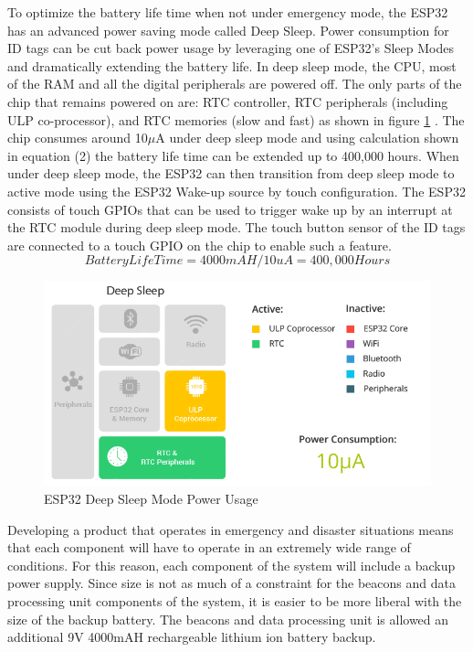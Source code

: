 \pagebreak
To optimize the battery life time when not under emergency mode, the ESP32 has an advanced power saving mode called Deep Sleep. Power consumption for ID tags can be cut back power usage by leveraging one of ESP32’s Sleep Modes and dramatically extending the battery life. In deep sleep mode, the CPU, most of the RAM and all the digital peripherals are powered off. The only parts of the chip that remains powered on are: RTC controller, RTC peripherals (including ULP co-processor), and RTC memories (slow and fast) as shown in figure \ref{ds_mode} \cite{R5-1-1}. The chip consumes around 10\(\mu\)A under deep sleep mode and using calculation shown in equation (2) the battery life time can be extended up to 400,000 hours. When under deep sleep mode, the ESP32 can then transition from deep sleep mode to active mode using the ESP32 Wake-up source by touch configuration. The ESP32 consists of touch GPIOs that can be used to trigger wake up by an interrupt at the RTC module during deep sleep mode. The touch button sensor of the ID tags are connected to a touch GPIO on the chip to enable such a feature. 
\medskip
\begin{equation}
Battery Life Time = 4000mAH/10uA = 400,000 Hours
\end{equation}

\medskip
\begin{figure}[H]
\centering
    \includegraphics[scale=0.7]{./images/ds_mode.png}
    \caption{ESP32 Deep Sleep Mode Power Usage}
    \label{ds_mode}
\end{figure}

\bigskip
Developing a product that operates in emergency and disaster situations means that each component will have to operate in an extremely wide range of conditions. For this reason, each component of the system will include a backup power supply. Since size is not as much of a constraint for the beacons and data processing unit components of the system, it is easier to be more liberal with the size of the backup battery. The beacons and data processing unit is allowed an additional 9V 4000mAH rechargeable lithium ion battery backup. 




